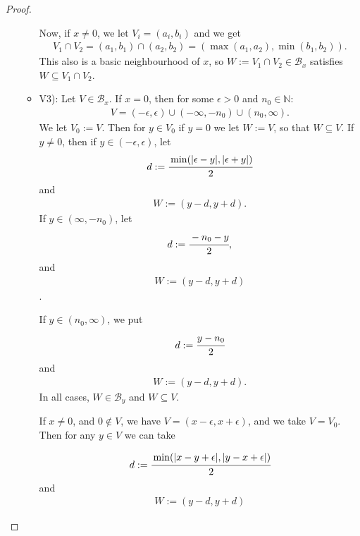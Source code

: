 \documentclass[12pt]{extarticle}
\newcommand{\abs}[1]{|#1|}
\newcommand{\N}{\mathbb{N}}
\newcommand{\<}{\langle}
\renewcommand{\>}{\rangle}
\theoremstyle{definition}
\begin{document}
\begin{proof}
\begin{enumerate}
\begin{itemize}
      Now, if $x \neq 0$, we let $V_i = (a_i,b_i)$ and we get
      \begin{align*}
        V_1 \cap V_2 = (a_1, b_1) \cap (a_2,b_2) = (\max(a_1,a_2), \min(b_1,b_2)).
      \end{align*}
      This also is a basic neighbourhood of $x$, so $W:=V_1 \cap V_2 \in \mathcal{B}_x$ satisfies  $W \subseteq V_1 \cap V_2$.
    \item
      V3): Let $V \in \mathcal{B}_x$. If $x = 0$, then for some $\epsilon>0$ and $n_0 \in \N$:
      \begin{align*}
        V = (-\epsilon, \epsilon) \cup (-\infty, -n_0) \cup (n_0, \infty).
      \end{align*}
      We let $V_0 := V$. Then for $y \in V_0$ if $y=0$ we let $W:=V$, so that $W \subseteq V$. If $y \neq 0$, then if $y \in (-\epsilon,\epsilon)$, let 
      \begin{align*}
        d := \cfrac{\min(\abs{\epsilon-y}, \abs{\epsilon+y})}{2}
      \end{align*}
      and 
      \begin{align*}
        W:= (y-d,y+d).
      \end{align*}
      If $y \in (\infty, -n_0)$, let
      \begin{align*}
        d:= \cfrac{-n_0 - y}{2},
      \end{align*}
      and
      \begin{align*}
        W:= (y-d, y+d)
      \end{align*}.

      If $y \in (n_0, \infty)$, we put
      \begin{align*}
        d := \cfrac{y-n_0}{2}
      \end{align*}
      and
      \begin{align*}
        W := (y-d, y+d).
      \end{align*}
      In all cases, $W \in \mathcal{B}_y$ and $W \subseteq V$.

      If $x \neq 0$, and $0 \not \in V$, we have $V = (x-\epsilon,x+\epsilon)$, and we take $V = V_0$. Then for any $y \in V$ we can take

      \begin{align*}
        d:= \cfrac{\min(\abs{x-y+\epsilon}, \abs{y-x+\epsilon})}{2}
      \end{align*}
      and
      \begin{align*}
        W:= (y-d, y+d)
      \end{align*}


\end{itemize}
\end{enumerate}
\end{proof}
\end{document}

